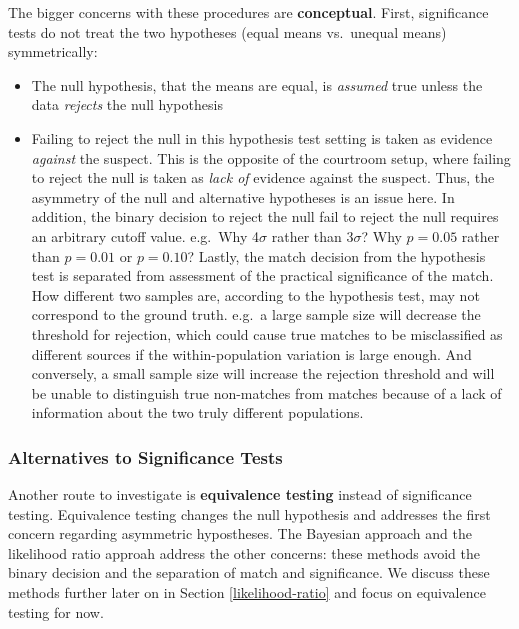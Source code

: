 \documentclass[]{book}
\providecommand{\tightlist}{%
  \setlength{\itemsep}{0pt}\setlength{\parskip}{0pt}}
\theoremstyle{definition}
\theoremstyle{definition}
\theoremstyle{remark}
\begin{document}
The bigger concerns with these procedures are \textbf{conceptual}.
First, significance tests do not treat the two hypotheses (equal means
vs.~unequal means) symmetrically:

\begin{itemize}
\tightlist
\item
  The null hypothesis, that the means are equal, is \emph{assumed} true
  unless the data \emph{rejects} the null hypothesis
\item
  Failing to reject the null in this hypothesis test setting is taken as
  evidence \emph{against} the suspect. This is the opposite of the
  courtroom setup, where failing to reject the null is taken as
  \emph{lack of} evidence against the suspect. Thus, the asymmetry of
  the null and alternative hypotheses is an issue here. In addition, the
  binary decision to reject the null fail to reject the null requires an
  arbitrary cutoff value. e.g.~Why 4\(\sigma\) rather than 3\(\sigma\)?
  Why \(p = 0.05\) rather than \(p = 0.01\) or \(p = 0.10\)? Lastly, the
  match decision from the hypothesis test is separated from assessment
  of the practical significance of the match. How different two samples
  are, according to the hypothesis test, may not correspond to the
  ground truth. e.g.~a large sample size will decrease the threshold for
  rejection, which could cause true matches to be misclassified as
  different sources if the within-population variation is large enough.
  And conversely, a small sample size will increase the rejection
  threshold and will be unable to distinguish true non-matches from
  matches because of a lack of information about the two truly different
  populations. 
\end{itemize}

\subsubsection{Alternatives to Significance
Tests}\label{alternatives-to-significance-tests}

Another route to investigate is \textbf{equivalence testing} instead of
significance testing. Equivalence testing changes the null hypothesis
and addresses the first concern regarding asymmetric hypostheses. The
Bayesian approach and the likelihood ratio approah address the other
concerns: these methods avoid the binary decision and the separation of
match and significance. We discuss these methods further later on in
Section \ref{likelihood-ratio} and focus on equivalence testing for now.
\end{document}
